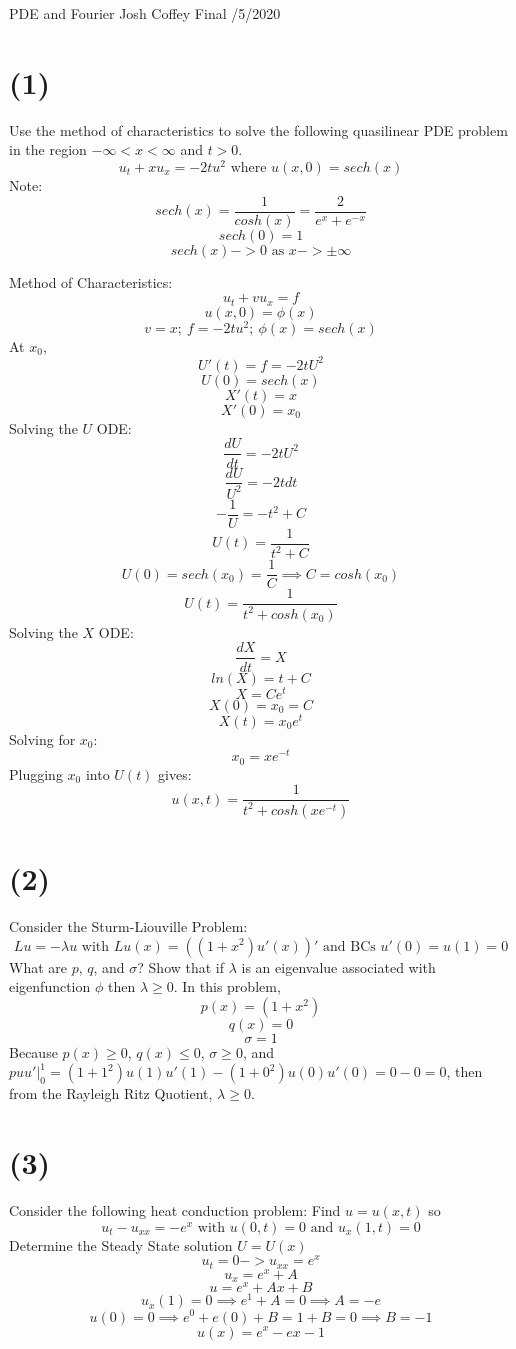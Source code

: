 \documentclass[preview,12pt]{article}
\begin{document}
\noindent PDE and Fourier\newline
Josh Coffey \newline
Final /5/2020 \newline

\section*{(1)}
    Use the method of characteristics to solve the following quasilinear PDE problem in the region $-\infty<x<\infty$ and $t>0.$
    $$u_t+xu_x=-2tu^2 \textrm{ where } u(x,0)=sech(x)$$
    Note:
    $$sech(x)=\frac{1}{cosh(x)}=\frac{2}{e^x+e^{-x}}$$
    $$sech(0)=1$$
    $$sech(x)->0\textrm{ as }x->\pm\infty$$
    
    Method of Characteristics:
    $$u_t+vu_x=f$$
    $$u(x,0)=\phi(x)$$
    $$v=x;\ f=-2tu^2;\ \phi(x)=sech(x)$$
    At $x_0$,
    $$U'(t)=f=-2tU^2$$
    $$U(0)=sech(x)$$
    $$X'(t)=x$$
    $$X'(0)=x_0$$
    Solving the $U$ ODE:
    $$\frac{dU}{dt}=-2tU^2$$
    $$\frac{dU}{U^2}=-2tdt$$
    $$-\frac{1}{U}=-t^2+C$$
    $$U(t)=\frac{1}{t^2+C}$$
    $$U(0)=sech(x_0)=\frac{1}{C}\implies C=cosh(x_0)$$
    $$U(t)=\frac{1}{t^2+cosh(x_0)}$$
    Solving the $X$ ODE:
    $$\frac{dX}{dt}=X$$
    $$ln(X)=t+C$$
    $$X=Ce^t$$
    $$X(0)=x_0=C$$
    $$X(t)=x_0e^t$$
    Solving for $x_0$:
    $$x_0=xe^{-t}$$
    Plugging $x_0$ into $U(t)$ gives:
    $$u(x,t)=\frac{1}{t^2+cosh(xe^{-t})}$$

\section*{(2)}
    Consider the Sturm-Liouville Problem:
    $$Lu=-\lambda u \textrm{ with } Lu(x)=\left((1+x^2)u'(x)\right)' \textrm{ and BCs } u'(0)=u(1)=0$$
    What are $p$, $q$, and $\sigma$? Show that if $\lambda$ is an eigenvalue associated with eigenfunction $\phi$ then $\lambda \geq 0$. \newline
    In this problem, 
    $$p(x)=(1+x^2)$$
    $$q(x)=0$$
    $$\sigma=1$$
    Because $p(x)\geq0$, $q(x)\leq 0$, $\sigma\geq 0$, and $puu'|^1_0=(1+1^2)u(1)u'(1)-(1+0^2)u(0)u'(0)=0-0=0$, then from the Rayleigh Ritz Quotient, $\lambda \geq 0$.

\section*{(3)}
    Consider the following heat conduction problem: Find $u=u(x,t)$ so 
    $$u_t-u_{xx}=-e^x \textrm{ with } u(0,t)=0 \textrm{ and } u_x(1,t)=0$$
    Determine the Steady State solution $U=U(x)$
    $$u_t=0 -> u_{xx}=e^x$$
    $$u_x=e^x+A$$
    $$u=e^x+Ax+B$$
    $$u_x(1)=0 \implies e^1+A=0 \implies A=-e$$
    $$u(0)=0 \implies e^0+e(0)+B=1+B=0 \implies B=-1$$
    $$u(x)=e^x-ex-1$$
    
\end{document}
